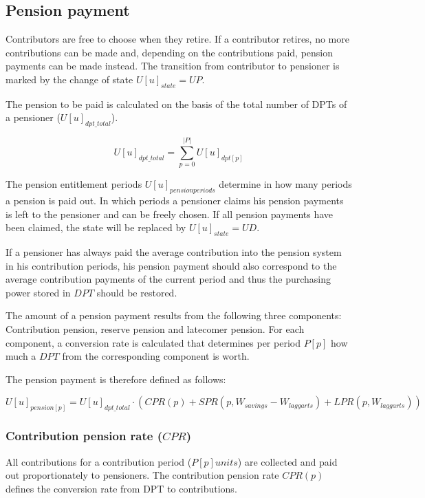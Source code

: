\subsection{Pension payment}

Contributors are free to choose when they retire. If a contributor retires, no more contributions can be made and, depending on the contributions paid, pension payments can be made instead. The transition from contributor to pensioner is marked by the change of state $U[u]_{state} = UP$.

The pension to be paid is calculated on the basis of the total number of DPTs of a pensioner ($U[u]_{dpt\_total}$).

\begin{equation}
U[u]_{dpt\_total} = \sum_{p=0}^{|P|} U[u]_{dpt[p]}
\end{equation}

The pension entitlement periods $U[u]_{pensionperiods}$ determine in how many periods a pension is paid out. In which periods a pensioner claims his pension payments is left to the pensioner and can be freely chosen. If all pension payments have been claimed, the state will be replaced by $U[u]_{state} = UD$.

If a pensioner has always paid the average contribution into the pension system in his contribution periods, his pension payment should also correspond to the average contribution payments of the current period and thus the purchasing power stored in $DPT$ should be restored.

The amount of a pension payment results from the following three components: Contribution pension, reserve pension and latecomer pension. For each component, a conversion rate is calculated that determines per period $P[p]$ how much a $DPT$ from the corresponding component is worth.

The pension payment is therefore defined as follows:

\begin{dmath}
U[u]_{pension[p]} = U[u]_{dpt\_total} \cdot (CPR(p) + SPR(p, W_{savings} - W_{laggarts}) + LPR(p, W_{laggarts}))
\end{dmath}

\subsubsection{Contribution pension rate ($CPR$)}
All contributions for a contribution period ($P[p]units$) are collected and paid out proportionately to pensioners. The contribution pension rate $CPR(p)$ defines the conversion rate from DPT to contributions.

